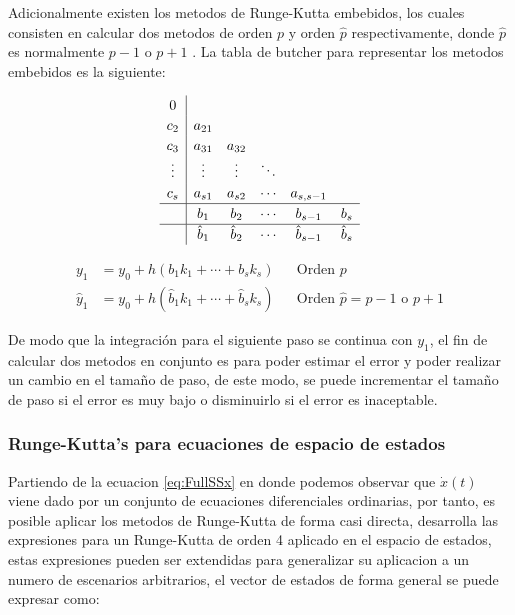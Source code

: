         Adicionalmente existen los metodos de Runge-Kutta embebidos, los cuales consisten en calcular dos metodos de orden $p$ y orden $\hat{p}$ respectivamente, donde $\hat{p}$ es normalmente $p-1$ o $p+1$ \Parencite{hairer1991solving}. La tabla de butcher para representar los metodos embebidos es la siguiente:

        \begin{equation}\label{eq:embebidoButcher}
            \renewcommand\arraystretch{1.2}
            \begin{array}
            {c|ccccc}
            0\\
            c_2 & a_{21}\\
            c_3 & a_{31} & a_{32}\\
            \vdots & \vdots & \vdots & \ddots\\
            c_s & a_{s1} & a_{s2} & \cdots & a_{s,s-1}\\
            \hline
            & b_1 & b_2 & \cdots & b_{s-1} &  b_{s}\\
            \hline
            & \hat{b}_1 & \hat{b}_2 & \cdots & \hat{b}_{s-1} &  \hat{b}_{s}
            \end{array}
        \end{equation}

        \begin{align}
            y_1 &= y_0 + h(b_1 k_1 + \cdots + b_s k_s) & &\text{Orden $p$}\\
            \hat{y}_1 &= y_0 + h(\hat{b}_1 k_1 + \cdots +\hat{b}_s k_s) & &\text{Orden $\hat{p} = p-1$ o $p+1$}
        \end{align}

        De modo que la integración para el siguiente paso se continua con $y_1$, el fin de calcular dos metodos en conjunto es para poder estimar el error y poder realizar un cambio en el tamaño de paso, de este modo, se puede incrementar el tamaño de paso si el error es muy bajo o disminuirlo si el error es inaceptable.
        
        \subsubsection{Runge-Kutta's para ecuaciones de espacio de estados}

            Partiendo de la ecuacion \cref{eq:FullSSx} en donde podemos observar que $\dot{x}(t)$ viene dado por un conjunto de ecuaciones diferenciales ordinarias, por tanto, es posible aplicar los metodos de Runge-Kutta de forma casi directa, \textcite{horacio1997metodos} desarrolla las expresiones para un Runge-Kutta de orden 4 aplicado en el espacio de estados, estas expresiones pueden ser extendidas para generalizar su aplicacion a un numero de escenarios arbitrarios, el vector de estados de forma general se puede expresar como:

